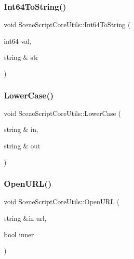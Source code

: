 \hypertarget{class_scene_script_core_utils_ad10fe7b2df7b2d4de06f34967420da15}{}\label{class_scene_script_core_utils_ad10fe7b2df7b2d4de06f34967420da15} 
\subsubsection{\texorpdfstring{Int64\+To\+String()}{Int64ToString()}}
{\footnotesize\ttfamily void Scene\+Script\+Core\+Utils\+::\+Int64\+To\+String (\begin{DoxyParamCaption}\item[{int64}]{val,  }\item[{string \&}]{str }\end{DoxyParamCaption})}

\hypertarget{class_scene_script_core_utils_abf1b29c423616c51cd7ca6c654ac4971}{}\label{class_scene_script_core_utils_abf1b29c423616c51cd7ca6c654ac4971} 
\subsubsection{\texorpdfstring{Lower\+Case()}{LowerCase()}}
{\footnotesize\ttfamily void Scene\+Script\+Core\+Utils\+::\+Lower\+Case (\begin{DoxyParamCaption}\item[{string \&}]{in,  }\item[{string \&}]{out }\end{DoxyParamCaption})}

\hypertarget{class_scene_script_core_utils_abc64efec7afd2f9fb0256d56dc08f88a}{}\label{class_scene_script_core_utils_abc64efec7afd2f9fb0256d56dc08f88a} 
\subsubsection{\texorpdfstring{Open\+U\+R\+L()}{OpenURL()}\hspace{0.1cm}{\footnotesize\ttfamily [1/2]}}
{\footnotesize\ttfamily void Scene\+Script\+Core\+Utils\+::\+Open\+U\+RL (\begin{DoxyParamCaption}\item[{string \&in}]{url,  }\item[{bool}]{inner }\end{DoxyParamCaption})}

